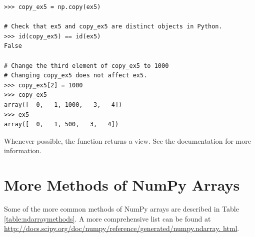 \begin{lstlisting}
>>> copy_ex5 = np.copy(ex5) 

# Check that ex5 and copy_ex5 are distinct objects in Python.
>>> id(copy_ex5) == id(ex5) 
False

# Change the third element of copy_ex5 to 1000
# Changing copy_ex5 does not affect ex5.
>>> copy_ex5[2] = 1000 
>>> copy_ex5
array([  0,   1, 1000,   3,   4])
>>> ex5
array([  0,   1, 500,   3,   4])
\end{lstlisting} 

Whenever possible, the function  returns a view. 
See the documentation for more information. 



\section*{More Methods of NumPy Arrays} 
Some of the more common methods of NumPy arrays are described in Table \ref{table:ndarraymethods}. 
A more comprehensive list can be found at
\url{http://docs.scipy.org/doc/numpy/reference/generated/numpy.ndarray.
html}.

